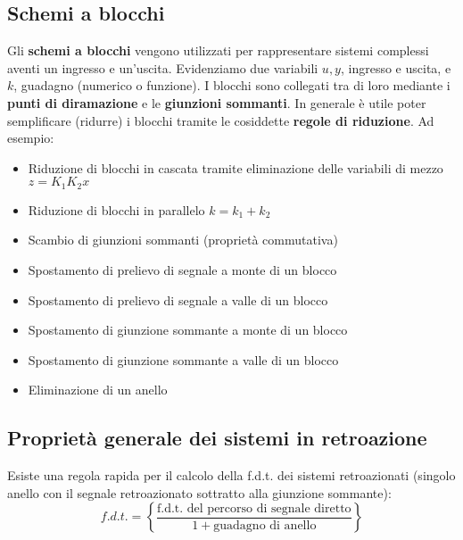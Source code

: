 \documentclass[11pt]{article}
\begin{document}
\subsection{Schemi a blocchi}
Gli \textbf{schemi a blocchi} vengono utilizzati per rappresentare sistemi complessi aventi un ingresso e un'uscita. Evidenziamo due variabili $u,y$, ingresso e uscita, e $k$, guadagno (numerico o funzione). I blocchi sono collegati tra di loro mediante i \textbf{punti di diramazione} e le \textbf{giunzioni sommanti}.
In generale è utile poter semplificare (ridurre) i blocchi tramite le cosiddette \textbf{regole di riduzione}. Ad esempio:
\begin{itemize}
    \item Riduzione di blocchi in cascata tramite eliminazione delle variabili di mezzo $z=K_1K_2x$
    \item Riduzione di blocchi in parallelo $k=k_1+k_2$
    \item Scambio di giunzioni sommanti (proprietà commutativa)
    \item Spostamento di prelievo di segnale a monte di un blocco
    \item Spostamento di prelievo di segnale a valle di un blocco
    \item Spostamento di giunzione sommante a monte di un blocco
    \item Spostamento di giunzione sommante a valle di un blocco
    \item Eliminazione di un anello
\end{itemize}
\subsection{Proprietà generale dei sistemi in retroazione}
Esiste una regola rapida per il calcolo della f.d.t. dei sistemi retroazionati (singolo anello con il segnale retroazionato sottratto alla giunzione sommante):
\begin{displaymath}
    f.d.t. = \left\{\frac{\textrm{f.d.t. del percorso di segnale diretto}}{1+\textrm{guadagno di anello}}\right\}
\end{displaymath}
\end{document}
